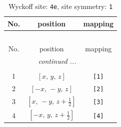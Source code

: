 \documentclass[fleqn,8pt]{jsarticle}
\begin{document}
\begin{longtable}{ccc}
\caption{Wyckoff site: {\tt 4e}, site symmetry: {\tt 1}}
 \\
 \hline \hline
No. & position & mapping \\ \hline \endfirsthead

\multicolumn{2}{l}{\tablename\ \thetable{}} \\
 \hline \hline
No. & position & mapping \\ \hline \endhead

 \hline \hline
\multicolumn{2}{r}{\footnotesize\it continued ...} \\ \endfoot

 \hline \hline
\multicolumn{2}{r}{} \\ \endlastfoot

1 & $\left[ x,\, y,\, z \right]$ & {\tt [1]} \\ \hline
2 & $\left[ - x,\, - y,\, z \right]$ & {\tt [2]} \\ \hline
3 & $\left[ x,\, - y,\, z + \frac{1}{2} \right]$ & {\tt [3]} \\ \hline
4 & $\left[ - x,\, y,\, z + \frac{1}{2} \right]$ & {\tt [4]} \\
\end{longtable}
\end{document}
